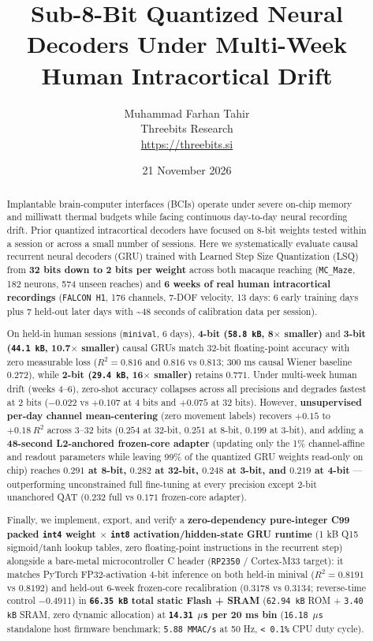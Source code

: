 \documentclass[11pt,a4paper]{article}
\title{Sub-8-Bit Quantized Neural Decoders Under Multi-Week Human Intracortical Drift}
\author{Muhammad Farhan Tahir\\Threebits Research\\\url{https://threebits.si}}
\date{21 November 2026}
\begin{document}
\maketitle

\begin{abstract}
Implantable brain-computer interfaces (BCIs) operate under severe on-chip memory and milliwatt thermal budgets while facing continuous day-to-day neural recording drift. Prior quantized intracortical decoders have focused on 8-bit weights tested within a session or across a small number of sessions. Here we systematically evaluate causal recurrent neural decoders (GRU) trained with Learned Step Size Quantization (LSQ) from \textbf{32 bits down to 2 bits per weight} across both macaque reaching (\texttt{MC\_Maze}, 182 neurons, 574 unseen reaches) and \textbf{6 weeks of real human intracortical recordings} (\texttt{FALCON H1}, 176 channels, 7-DOF velocity, 13 days: 6 early training days plus 7 held-out later days with \textasciitilde{}48 seconds of calibration data per session).

On held-in human sessions (\texttt{minival}, 6 days), \textbf{4-bit (\texttt{58.8 kB}, 8$\times$ smaller)} and \textbf{3-bit (\texttt{44.1 kB}, 10.7$\times$ smaller)} causal GRUs match 32-bit floating-point accuracy with zero measurable loss ($R^2 = 0.816$ and $0.816$ vs $0.813$; 300 ms causal Wiener baseline $0.272$), while \textbf{2-bit (\texttt{29.4 kB}, 16$\times$ smaller)} retains $0.771$. Under multi-week human drift (weeks 4--6), zero-shot accuracy collapses across all precisions and degrades fastest at 2 bits ($-0.022$ vs $+0.107$ at 4 bits and $+0.075$ at 32 bits). However, \textbf{unsupervised per-day channel mean-centering} (zero movement labels) recovers $+0.15$ to $+0.18\ R^2$ across 3--32 bits ($0.254$ at 32-bit, $0.251$ at 8-bit, $0.199$ at 3-bit), and adding a \textbf{48-second L2-anchored frozen-core adapter} (updating only the 1\% channel-affine and readout parameters while leaving 99\% of the quantized GRU weights read-only on chip) reaches \textbf{$0.291$ at 8-bit, $0.282$ at 32-bit, $0.248$ at 3-bit, and $0.219$ at 4-bit} --- outperforming unconstrained full fine-tuning at every precision except 2-bit unanchored QAT ($0.232$ full vs $0.171$ frozen-core adapter).

Finally, we implement, export, and verify a \textbf{zero-dependency pure-integer C99 packed \texttt{int4} weight $\times$ \texttt{int8} activation/hidden-state GRU runtime} (1 kB Q15 sigmoid/tanh lookup tables, zero floating-point instructions in the recurrent step) alongside a bare-metal microcontroller C header (\texttt{RP2350} / Cortex-M33 target): it matches PyTorch FP32-activation 4-bit inference on both held-in minival ($R^2 = 0.8191$ vs $0.8192$) and held-out 6-week frozen-core recalibration ($0.3178$ vs $0.3134$; reverse-time control $-0.4911$) in \textbf{\texttt{66.35 kB} total static Flash + SRAM} (\texttt{62.94 kB} ROM + \texttt{3.40 kB} SRAM, zero dynamic allocation) at \textbf{\texttt{14.31 $\mu$s} per 20 ms bin} (\texttt{16.18 $\mu$s} standalone host firmware benchmark; \texttt{5.88 MMAC/s} at 50 Hz, \texttt{< 0.1\%} CPU duty cycle).

\end{abstract}
\end{document}
